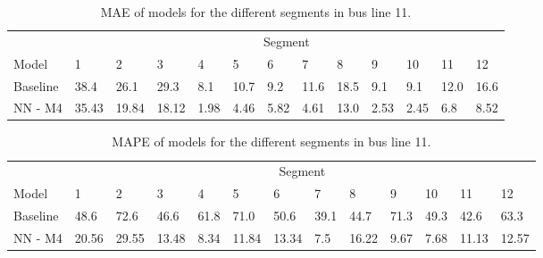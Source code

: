 \begin{table}[H]
	\centering
	\caption{MAE of models for the different segments in bus line 11.}
	\label{tbl:model-mae-of-segs-211}
	\begin{tabular}{ l | l | l | l | l | l | l | l | l | l | l | l | l}
		& \multicolumn{12}{c}{Segment} \\
		Model       & 1 & 2 & 3 & 4 & 5 & 6 & 7 & 8 & 9 & 10 & 11 & 12 \\
		\hline
		Baseline  & 38.4 & 26.1 & 29.3 & 8.1 & 10.7 & 9.2 & 11.6 & 18.5 & 9.1 & 9.1  & 12.0 & 16.6 \\
		NN - M4         & 35.43& 19.84& 18.12& 1.98& 4.46& 5.82& 4.61& 13.0& 2.53& 2.45& 6.8& 8.52\\
	\end{tabular}
\end{table}

\begin{table}[H]
	\centering
	\caption{MAPE of models for the different segments in bus line 11.}
	\label{fig:model-mape-of-segs-211}
	\begin{tabular}{ l | l | l | l | l | l | l | l | l | l | l | l | l}
		& \multicolumn{12}{c}{Segment} \\
		Model       & 1 & 2 & 3 & 4 & 5 & 6 & 7 & 8 & 9 & 10 & 11 & 12 \\
		\hline
		Baseline  & 48.6 & 72.6 & 46.6 & 61.8 & 71.0 & 50.6 & 39.1 & 44.7 & 71.3 & 49.3  & 42.6 & 63.3 \\
		NN - M4         & 20.56& 29.55& 13.48& 8.34& 11.84& 13.34& 7.5& 16.22& 9.67& 7.68& 11.13& 12.57\\
	\end{tabular}
\end{table}





